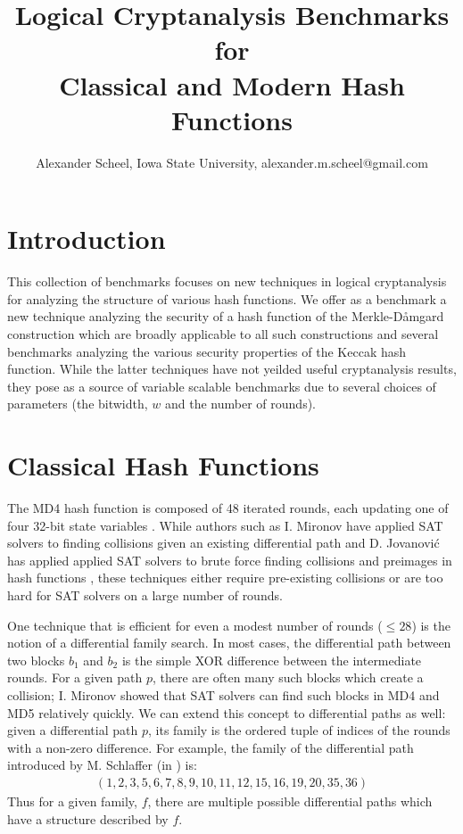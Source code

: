 \documentclass[final]{ieee}
\begin{document}
\title{Logical Cryptanalysis Benchmarks for \\ Classical and Modern Hash Functions}
\author{Alexander Scheel, Iowa State University, alexander.m.scheel@gmail.com}

\maketitle
\thispagestyle{empty}
\pagestyle{empty}

\section{Introduction}
This collection of benchmarks focuses on new techniques in logical
cryptanalysis for analyzing the structure of various hash functions. We
offer as a benchmark a new technique analyzing the security of a hash function
of the Merkle-D{\aa}mgard construction which are broadly applicable to all such
constructions and several benchmarks analyzing the various security properties
of the Keccak hash function. While the latter techniques have not yeilded
useful cryptanalysis results, they pose as a source of variable scalable
benchmarks due to several choices of parameters (the bitwidth, $w$ and the
number of rounds).

\section{Classical Hash Functions}
The MD4 hash function is composed of 48 iterated rounds, each updating one of
four 32-bit state variables \cite{rfc1320}. While authors such as I. Mironov
have applied SAT solvers to finding collisions given an existing differential
path \cite{Mironov2006} and D. Jovanovi{\'{c}} has applied applied SAT solvers
to brute force finding collisions and preimages in hash functions
\cite{LogicalAnalysis}, these techniques either require pre-existing
collisions or are too hard for SAT solvers on a large number of rounds.

One technique that is efficient for even a modest number of rounds ($\leq 28$)
is the notion of a differential family search. In most cases, the differential
path between two blocks $b_1$ and $b_2$ is the simple XOR difference between
the intermediate rounds. For a given path $p$, there are often many such blocks
which create a collision; I. Mironov showed that SAT solvers can find such
blocks in MD4 and MD5 \cite{Mironov2006} relatively quickly. We can extend this
concept to differential paths as well: given a differential path $p$, its
family is the ordered tuple of indices of the rounds with a non-zero
difference. For example, the family of the differential path introduced by
M. Schlaffer (in \cite{Schlaffer2006}) is:
\begin{align*}
    (1, 2, 3, 5, 6, 7, 8, 9, 10, 11, 12, 15, 16, 19, 20, 35, 36)
\end{align*}
Thus for a given family, $f$, there are multiple possible differential paths
which have a structure described by $f$.
\end{document}
